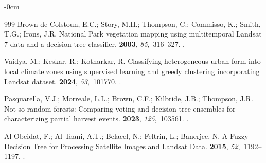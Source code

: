 \documentclass[coasts,article,accept,pdftex,oneauthor]{Definitions/mdpi}
\begin{document}
\begin{adjustwidth}{-\extralength}{0cm}
\begin{thebibliography}{999}
{Brown de Colstoun}, E.C.; Story, M.H.; Thompson, C.; Commisso, K.; Smith,
  T.G.; Irons, J.R.
\newblock National Park vegetation mapping using multitemporal Landsat 7 data
  and a decision tree classifier.
 {\bf 2003}, {\em 85},~316--327.
.

Vaidya, M.; Keskar, R.; Kotharkar, R.
\newblock Classifying heterogeneous urban form into local climate zones using
  supervised learning and greedy clustering incorporating Landsat dataset.
 {\bf 2024}, {\em 53},~101770.
.

Pasquarella, V.J.; Morreale, L.L.; Brown, C.F.; Kilbride, J.B.; Thompson, J.R.
\newblock Not-so-random forests: Comparing voting and decision tree ensembles
  for characterizing partial harvest events.
 {\bf 2023}, {\em 125},~103561.
.

Al-Obeidat, F.; Al-Taani, A.T.; Belacel, N.; Feltrin, L.; Banerjee, N.
\newblock A Fuzzy Decision Tree for Processing Satellite Images and Landsat
  Data.
 {\bf 2015}, {\em 52},~1192--1197.
.

\end{thebibliography}

\PublishersNote{}

\end{adjustwidth}
\end{document}

